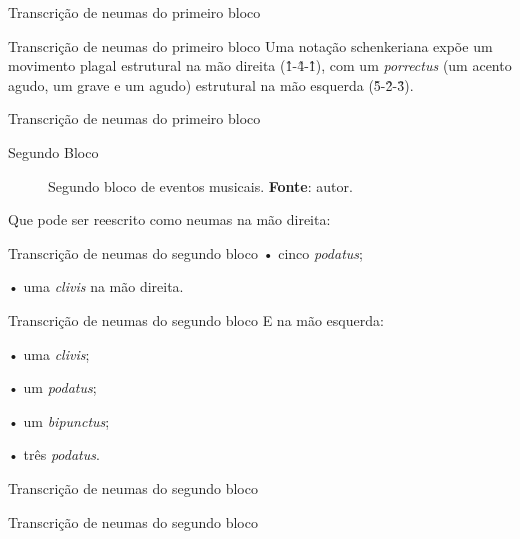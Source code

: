 \documentclass[aspectratio=169]{beamer}
\begin{document}
\begin{frame}{Transcrição de neumas do primeiro bloco}\label{fig:neumaMD1}
  \centering{}
\end{frame} 

\begin{frame}{Transcrição de neumas do primeiro bloco}\label{fig:neumaMD1}
Uma notação schenkeriana expõe um movimento plagal estrutural na mão direita (\^1-\^4-\^1), com um \emph{porrectus} (um acento agudo, um grave e um agudo) estrutural na mão esquerda (\^5-\^2-\^3).
\end{frame}

\begin{frame}{Transcrição de neumas do primeiro bloco}\label{fig:neumaMD1}
  \centering{}
\end{frame}

\begin{frame}{Segundo Bloco}
\begin{figure}[!h]
  \centering
  
  \caption{Segundo bloco de eventos musicais. \textbf{Fonte}: autor.}
  \label{fig:ask3}
\end{figure}
\end{frame}

Que pode ser reescrito como neumas na mão direita:

\begin{frame}{Transcrição de neumas do segundo bloco}\label{fig:neumaMD2}
• cinco \emph{podatus};

• uma \emph{clivis} na mão direita. 
\end{frame}

\begin{frame}{Transcrição de neumas do segundo bloco}\label{fig:neumaMD2}
E na mão esquerda:

• uma \emph{clivis};

• um \emph{podatus};

• um \emph{bipunctus};

• três \emph{podatus}.
\end{frame}

\begin{frame}{Transcrição de neumas do segundo bloco}\label{fig:neumaMD2}
  \centering{}
\end{frame}

\begin{frame}{Transcrição de neumas do segundo bloco}\label{fig:neumaMD2}
  \centering{}
\end{frame}
\end{document}
